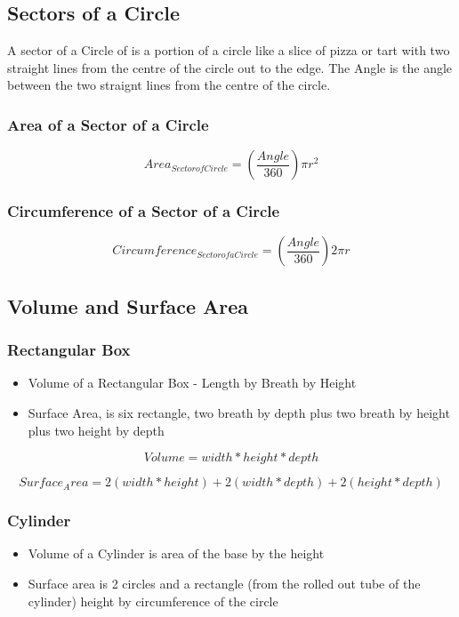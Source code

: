 \documentclass{article}
\begin{document}
\subsection{Sectors of a Circle}
A sector of a Circle of is a portion of a circle like a slice of pizza or tart with two straight lines from the centre of the circle out to the edge. The Angle is the angle between the two straignt lines from the centre of the circle.

\subsubsection{Area of a Sector of a Circle}
\begin{equation}
Area_{ Sector of Circle} = ( \frac{Angle }{ 360 }) \pi r^ 2
\end{equation}


\subsubsection{Circumference of a Sector of a Circle}
\begin{equation}
Circumference_{ Sector of a Circle} = ( \frac{Angle }{ 360} ) 2 \pi r
\end{equation}

\newpage
\subsection{Volume and Surface Area}
\subsubsection{Rectangular Box}
\begin{itemize}
\item Volume of a Rectangular Box - Length by Breath by Height
\item Surface Area, is six rectangle, two breath by depth plus two breath by height plus two height by depth
\end{itemize}

\begin{equation}
Volume = width * height * depth
\end{equation}

\begin{equation}
Surface_Area = 2(width * height) + 2(width * depth) + 2(height * depth)
\end{equation}

\subsubsection{Cylinder}
\begin{itemize}
\item Volume of a Cylinder is area of the base by the height
\item Surface area is 2 circles and a rectangle (from the rolled out tube of the cylinder) height by circumference of the circle
\end{itemize}
\end{document}
